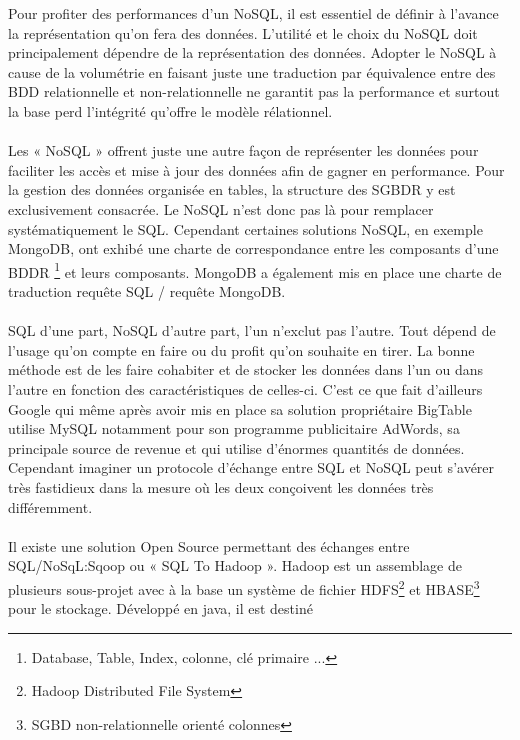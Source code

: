 Pour profiter des performances d'un \textsf{NoSQL}, il est essentiel
de définir à l'avance la représentation qu'on fera des
données. L'utilité et le choix du \textsf{NoSQL} doit principalement
dépendre de la représentation des données. Adopter le \textsf{NoSQL} à
cause de la volumétrie en faisant juste une traduction par équivalence
entre des \textsf{BDD} relationnelle et non-relationnelle ne garantit
pas la performance et surtout la base perd l'intégrité qu'offre le modèle 
rélationnel.  
\\ \\ 
Les « \textsf{NoSQL} » offrent juste une autre façon
de représenter les données pour faciliter les accès      et mise à jour des
données afin de gagner en performance. Pour la gestion des données 
organisée en tables, la structure des \textsf{SGBDR} y est exclusivement
consacrée. Le \textsf{NoSQL} n'est donc pas là pour remplacer systématiquement
le  \textsf{SQL}. Cependant
certaines solutions \textsf{NoSQL}, en exemple \textsf{MongoDB}, ont
exhibé une charte de correspondance entre les composants d'une
\textsf{BDDR} \footnote{Database, Table, Index, colonne, clé
  primaire ...} et leurs composants. \textsf{MongoDB} a également mis
en place une charte de traduction requête \textsf{SQL} / requête
\textsf{MongoDB}.
\\
\\
\textsf{SQL} d'une part, \textsf{NoSQL} d'autre part, l'un n'exclut pas l'autre.
Tout dépend de l'usage qu'on compte en faire ou du profit qu'on
souhaite en tirer. La bonne méthode est de les faire cohabiter et de stocker
les données dans l'un ou dans l'autre en fonction des caractéristiques de 
celles-ci. C'est ce que fait d'ailleurs \textsf{Google} qui
même après avoir mis en place sa solution
propriétaire \textsf{BigTable} utilise \textsf{MySQL}
notamment pour son programme publicitaire \textsf{AdWords}, sa
principale source de revenue et qui utilise d'énormes quantités de
données. Cependant imaginer un protocole d'échange entre \textsf{SQL}
et \textsf{NoSQL} peut s'avérer très fastidieux dans la mesure où les
deux conçoivent les données très différemment.
\\
\\
Il existe une solution \textsf{Open Source} permettant des échanges
entre \textsf{SQL}/\textsf{NoSqL}:\textsf{Sqoop} ou « SQL To Hadoop
». \textsf{Hadoop} est un assemblage de plusieurs
sous-projet avec à la base un système de
fichier \textsf{HDFS}\footnote{Hadoop Distributed File System}
et \textsf{HBASE}\footnote{\textsf{SGBD} non-relationnelle orienté
colonnes} pour le stockage. Développé en \textsf{java}, il est destiné

